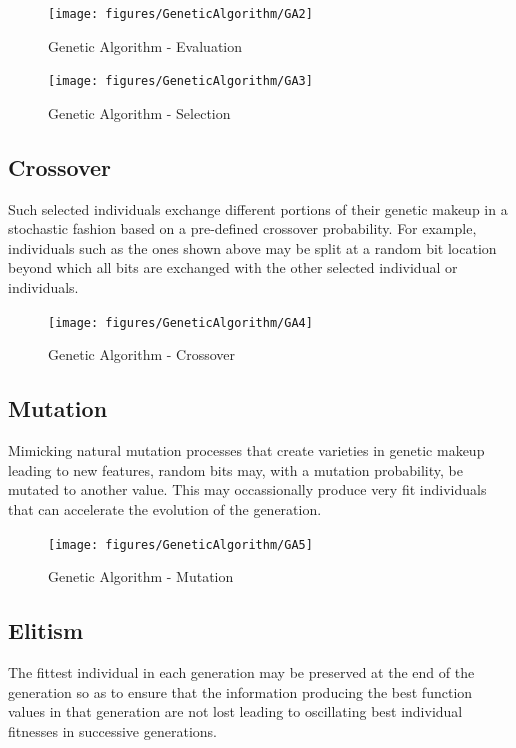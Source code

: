 \documentclass[ExampleMasters.tex]{subfiles}
\begin{document}
			\begin{figure}[H]
				\centering
				\texttt{[image: figures/GeneticAlgorithm/GA2]}
				\caption{Genetic Algorithm - Evaluation}
				\label{GA2}
			\end{figure}

			\begin{figure}[H]
				\centering
				\texttt{[image: figures/GeneticAlgorithm/GA3]}
				\caption{Genetic Algorithm - Selection}
				\label{GA3}
			\end{figure}

		\subsection{Crossover}
			Such selected individuals exchange different portions of their genetic makeup in a stochastic fashion based on a pre-defined crossover probability. For example, individuals such as the ones shown above may be split at a random bit location beyond which all bits are exchanged with the other selected individual or individuals.\\ 

			\begin{figure}[H]
				\centering
				\texttt{[image: figures/GeneticAlgorithm/GA4]}
				\caption{Genetic Algorithm - Crossover}
				\label{GA4}
			\end{figure}

		\subsection{Mutation}
			Mimicking natural mutation processes that create varieties in genetic makeup leading to new features, random bits may, with a mutation probability, be mutated to another value. This may occassionally produce very fit individuals that can accelerate the evolution of the generation.\\

			\begin{figure}[H]
				\centering
				\texttt{[image: figures/GeneticAlgorithm/GA5]}
				\caption{Genetic Algorithm - Mutation}
				\label{GA5}
			\end{figure}

		\subsection{Elitism}
			The fittest individual in each generation may be preserved at the end of the generation so as to ensure that the information producing the best function values in that generation are not lost leading to oscillating best individual fitnesses in successive generations.\\
\end{document}
